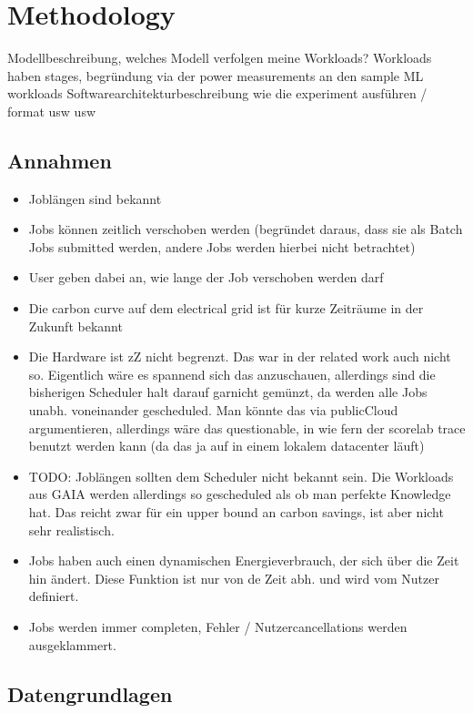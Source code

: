 \chapter{Methodology}

Modellbeschreibung, welches Modell verfolgen meine Workloads?
Workloads haben stages, begründung via der power measurements an den sample ML workloads
Softwarearchitekturbeschreibung
wie die experiment ausführen / format usw usw

\section{Annahmen}

\begin{itemize}
    \item Joblängen sind bekannt
    \item Jobs können zeitlich verschoben werden (begründet daraus, dass sie als Batch Jobs submitted werden, andere Jobs werden hierbei nicht betrachtet)
    \item User geben dabei an, wie lange der Job verschoben werden darf
    \item Die carbon curve auf dem electrical grid ist für kurze Zeiträume in der Zukunft bekannt
    \item Die Hardware ist zZ nicht begrenzt. Das war in der related work auch nicht so. Eigentlich wäre es spannend sich das anzuschauen, allerdings sind die bisherigen Scheduler halt darauf garnicht gemünzt, da werden alle Jobs unabh. voneinander gescheduled. Man könnte das via publicCloud argumentieren, allerdings wäre das questionable, in wie fern der scorelab trace benutzt werden kann (da das ja auf in einem lokalem datacenter läuft)
    \item TODO: Joblängen sollten dem Scheduler nicht bekannt sein. Die Workloads aus GAIA werden allerdings so gescheduled als ob man perfekte Knowledge hat. Das reicht zwar für ein upper bound an carbon savings, ist aber nicht sehr realistisch.  
    \item Jobs haben auch einen dynamischen Energieverbrauch, der sich über die Zeit hin ändert. Diese Funktion ist nur von de Zeit abh. und wird vom Nutzer definiert.
    \item Jobs werden immer completen, Fehler / Nutzercancellations werden ausgeklammert.
\end{itemize}

\section{Datengrundlagen}

